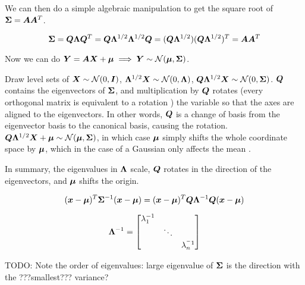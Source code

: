 \begin{tcolorbox}
    We can then do a simple algebraic manipulation to get the square root of ${\bm{\Sigma}} = {\bm{A}} {\bm{A}}^T$. 
    
    \begin{equation}
        {\bm{\Sigma}} = {\bm{Q}} {\bm{\Lambda}} {\bm{Q}}^T = {\bm{Q}} {\bm{\Lambda}}^{1/2} {\bm{\Lambda}}^{1/2} {\bm{Q}} = ({\bm{Q}} {\bm{\Lambda}}^{1/2}) ({\bm{Q}} {\bm{\Lambda}}^{1/2})^T = {\bm{A}} {\bm{A}}^T
    \end{equation}
    
    Now we can do ${\bm{Y}} = {\bm{A}} {\bm{X}} + {\bm{\mu}} \implies {\bm{Y}} \sim {\mathcal{N}}({\bm{\mu}}, {\bm{\Sigma}})$.
    
    Draw level sets of ${\bm{X}} \sim {\mathcal{N}}(0, {\bm{I}})$, ${\bm{\Lambda}}^{1/2} {\bm{X}} \sim {\mathcal{N}}(0, {\bm{\Lambda}})$, ${\bm{Q}} {\bm{\Lambda}}^{1/2} {\bm{X}} \sim {\mathcal{N}}(0, {\bm{\Sigma}})$. ${\bm{Q}}$ contains the eigenvectors of ${\bm{\Sigma}}$, and multiplication by ${\bm{Q}}$ rotates (every orthogonal matrix is equivalent to a rotation ) the variable so that the axes are aligned to the eigenvectors. In other words, ${\bm{Q}}$ is a change of basis from the eigenvector basis to the canonical basis, causing the rotation. ${\bm{Q}} {\bm{\Lambda}}^{1/2} {\bm{X}} + {\bm{\mu}} \sim {\mathcal{N}}({\bm{\mu}}, {\bm{\Sigma}})$, in which case ${\bm{\mu}}$ simply shifts the whole coordinate space by ${\bm{\mu}}$, which in the case of a Gaussian only affects the mean .
    
    In summary, the eigenvalues in ${\bm{\Lambda}}$ scale, ${\bm{Q}}$ rotates in the direction of the eigenvectors, and ${\bm{\mu}}$ shifts the origin.
    
    \begin{equation}
        ({\bm{x}} - {\bm{\mu}})^T {\bm{\Sigma}}^{-1} ({\bm{x}} - {\bm{\mu}}) = ({\bm{x}} - {\bm{\mu}})^T {\bm{Q}} {\bm{\Lambda}}^{-1} {\bm{Q}} ({\bm{x}} - {\bm{\mu}})
    \end{equation}
    
    \begin{equation}
        {\bm{\Lambda}}^{-1} = \begin{bmatrix}
            \lambda_1^{-1} & & \\
            & \ddots & \\
            & & \lambda_n^{^-1}
        \end{bmatrix}
    \end{equation}
    
    TODO: Note the order of eigenvalues: large eigenvalue of ${\bm{\Sigma}}$ is the direction with the ???smallest??? variance?
\end{tcolorbox}

